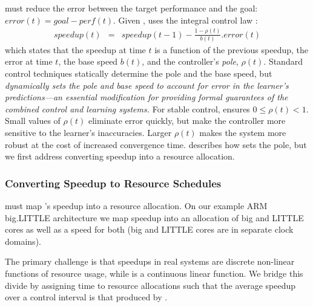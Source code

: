 \SYSTEM{} must reduce the error between the target performance and the goal: $ error(t) = goal - perf(t)$.
Given , \SYSTEM{} uses the integral control law
\cite{Hellerstein2004a}:
\begin{eqnarray}
  speedup(t) &=& speedup(t-1) - \frac{1 - \rho(t)}{b(t)}.error(t)
  \label{eqn:speedup-control}
\end{eqnarray}
which states that the speedup at time $t$ is a function of the
previous speedup, the error at time $t$, the base speed $b(t)$, and
the controller's \emph{pole}, $\rho(t)$.  Standard control techniques
statically determine the pole and the base speed, but \SYSTEM{}
\emph{dynamically sets the pole and base speed to account for error in
  the learner's predictions---an essential modification for providing
  formal guarantees of the combined control and learning systems.}
For stable control, \SYSTEM{} ensures $0 \le \rho(t) < 1$. Small
values of $\rho(t)$ eliminate error quickly, but make the controller
more sensitive to the learner's inaccuracies.  Larger $\rho(t)$ makes
the system more robust at the cost of increased convergence time.
 describes how \SYSTEM{} sets the pole, but we
first address converting speedup into a resource allocation.

\subsubsection{Converting Speedup to Resource Schedules}
\SYSTEM{} must map 's speedup into a resource
allocation.  On our example ARM big.LITTLE architecture we map speedup
into an allocation of big and LITTLE cores as well as a speed for both
(big and LITTLE cores are in separate clock domains).

The primary challenge is that speedups in real systems are discrete
non-linear functions of resource usage, while 
is a continuous linear function.  We bridge this divide by assigning
time to resource allocations such that the average speedup over a
control interval is that produced by .

